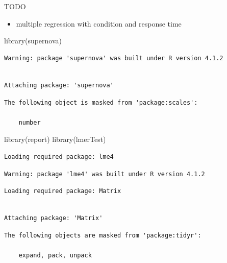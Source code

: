 \documentclass[
  letterpaper,
  DIV=11,
  numbers=noendperiod]{scrreprt}
\newenvironment{Shaded}{\begin{snugshade}}{\end{snugshade}}
\newcommand{\FunctionTok}[1]{\textcolor[rgb]{0.28,0.35,0.67}{#1}}
\newcommand{\NormalTok}[1]{\textcolor[rgb]{0.00,0.23,0.31}{#1}}
\providecommand{\tightlist}{%
  \setlength{\itemsep}{0pt}\setlength{\parskip}{0pt}}\usepackage{longtable,booktabs,array}
\begin{document}
TODO

\begin{itemize}
\tightlist
\item
  multiple regression with condition and response time
\end{itemize}

\begin{Shaded}
\begin{Highlighting}[]
\FunctionTok{library}\NormalTok{(supernova)}
\end{Highlighting}
\end{Shaded}

\begin{verbatim}
Warning: package 'supernova' was built under R version 4.1.2
\end{verbatim}

\begin{verbatim}

Attaching package: 'supernova'
\end{verbatim}

\begin{verbatim}
The following object is masked from 'package:scales':

    number
\end{verbatim}

\begin{Shaded}
\begin{Highlighting}[]
\FunctionTok{library}\NormalTok{(report)}
\FunctionTok{library}\NormalTok{(lmerTest)}
\end{Highlighting}
\end{Shaded}

\begin{verbatim}
Loading required package: lme4
\end{verbatim}

\begin{verbatim}
Warning: package 'lme4' was built under R version 4.1.2
\end{verbatim}

\begin{verbatim}
Loading required package: Matrix
\end{verbatim}

\begin{verbatim}

Attaching package: 'Matrix'
\end{verbatim}

\begin{verbatim}
The following objects are masked from 'package:tidyr':

    expand, pack, unpack
\end{verbatim}
\end{document}
